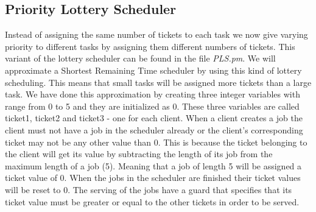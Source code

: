 \documentclass[12pt]{report}
\begin{document}
\subsection*{Priority Lottery Scheduler}
Instead of assigning the same number of tickets to each task we now give varying priority to different tasks by assigning them different numbers of tickets. This variant of the lottery scheduler can be found in the file \emph{PLS.pm}. We will approximate a Shortest Remaining Time scheduler by using this kind of lottery scheduling. This means that small tasks will be assigned more tickets than a large task. We have done this approximation by creating three integer variables with range from 0 to 5 and they are initialized as 0. These three variables are called ticket1, ticket2 and ticket3 - one for each client. When a client creates a job the client must not have a job in the scheduler already or the client's corresponding ticket may not be any other value than 0. This is because the ticket belonging to the client will get its value by subtracting the length of its job from the maximum length of a job (5). Meaning that a job of length 5 will be assigned a ticket value of 0. When the jobs in the scheduler are finished their ticket values will be reset to 0. The serving of the jobs have a guard that specifies that its ticket value must be greater or equal to the other tickets in order to be served.
\end{document}

